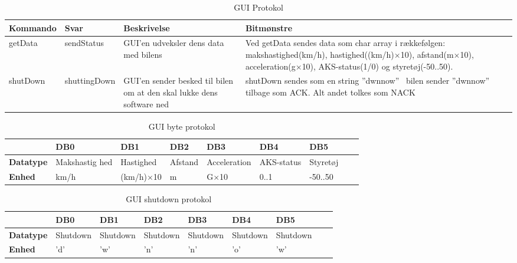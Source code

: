\begin{table}[ht]
\begin{tabularx}{\textwidth}{| Z | Z | Z | Z |} \hline

\textbf{Kommando} 						&
\textbf{Svar}							&
\textbf{Beskrivelse}					&
\textbf{Bitmønstre}						\\ \hline

getData &

sendStatus &

GUI'en udveksler dens data med bilens &

Ved getData sendes data som char array i rækkefølgen: makshastighed(km/h), hastighed((km/h)$\times$10), afstand(m$\times$10), acceleration(g$\times$10), AKS-status(1/0) og styretøj(-50..50). \\ \hline



shutDown &

shuttingDown &

GUI'en sender besked til bilen om at den skal lukke dens software ned &

shutDown sendes som en string ''dwnnow'' \
bilen sender ''dwnnow'' tilbage som ACK. Alt andet tolkes som NACK \\ \hline

\end{tabularx}
\caption{GUI Protokol}
\label{tbl:prt_gui}
\end{table}



\begin{table}[ht]
\begin{tabularx}{\textwidth}{| Z | Z | Z | Z | Z | Z | Z | Z | Z |} \hline

\textbf{}	&
\textbf{DB0}	&
\textbf{DB1}	&
\textbf{DB2}	&
\textbf{DB3}	&
\textbf{DB4}	&
\textbf{DB5}	\\ \hline

\textbf{Datatype} & Makshastig hed & Hastighed & Afstand & Acceleration & AKS-status & Styretøj \\ \hline
\textbf{Enhed} & km/h & (km/h)$\times$10 & m & G$\times$10 & 0..1 & -50..50 \\ \hline

\end{tabularx}
\caption{GUI byte protokol}
\label{tbl:prt_gui_byte}
\end{table}

\begin{table}[ht]
\begin{tabularx}{\textwidth}{| Z | Z | Z | Z | Z | Z | Z | Z | Z |} \hline

\textbf{}	&
\textbf{DB0}	&
\textbf{DB1}	&
\textbf{DB2}	&
\textbf{DB3}	&
\textbf{DB4}	&
\textbf{DB5}	\\ \hline

\textbf{Datatype} & Shutdown & Shutdown & Shutdown & Shutdown & Shutdown & Shutdown \\ \hline
\textbf{Enhed} & 'd' & 'w' & 'n' & 'n' & 'o' & 'w' \\ \hline

\end{tabularx}
\caption{GUI shutdown protokol}
\label{tbl:prt_gui_shutdown}
\end{table}

